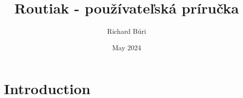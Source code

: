 \documentclass{article}
\title{Routiak - používateľská príručka}
\author{Richard Búri}
\date{May 2024}
\begin{document}
\maketitle

\tableofcontents
\newpage


\section{Introduction}
\end{document}
